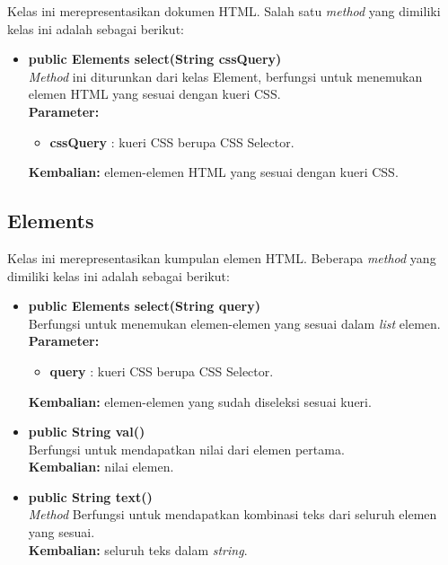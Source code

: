Kelas ini merepresentasikan dokumen HTML. Salah satu \textit{method} yang dimiliki kelas ini adalah sebagai berikut:
\begin{itemize}
	\item \textbf{public Elements select(String cssQuery)} \\
		\textit{Method} ini diturunkan dari kelas Element, berfungsi untuk menemukan elemen HTML yang sesuai dengan kueri CSS. \\
		\textbf{Parameter:} 
		\begin{itemize}
			\item \textbf{cssQuery} : kueri CSS berupa CSS Selector.
		\end{itemize}
		\textbf{Kembalian:} elemen-elemen HTML yang sesuai dengan kueri CSS.	
\end{itemize}

\subsection{Elements}

Kelas ini merepresentasikan kumpulan elemen HTML. Beberapa \textit{method} yang dimiliki kelas ini adalah sebagai berikut:
\begin{itemize}
	\item \textbf{public Elements select(String query)} \\
		Berfungsi untuk menemukan elemen-elemen yang sesuai dalam \textit{list} elemen. \\
		\textbf{Parameter:} 
		\begin{itemize}
			\item \textbf{query} : kueri CSS berupa CSS Selector.
		\end{itemize}
		\textbf{Kembalian:} elemen-elemen yang sudah diseleksi sesuai kueri.	
		
		\item \textbf{public String val()} \\
		Berfungsi untuk mendapatkan nilai dari elemen pertama. \\
		\textbf{Kembalian:} nilai elemen.	
		
		\item \textbf{public String text()} \\
		\textit{Method} Berfungsi untuk mendapatkan kombinasi teks dari seluruh elemen yang sesuai. \\
		\textbf{Kembalian:} seluruh teks dalam \textit{string}.	
\end{itemize}

